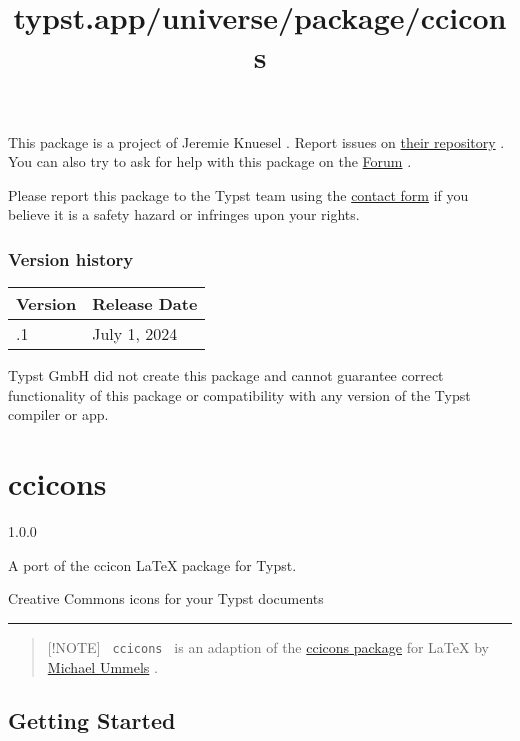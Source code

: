 This package is a project of Jeremie Knuesel . Report issues on
\href{https://github.com/knuesel/typst-minideck}{their repository} . You
can also try to ask for help with this package on the
\href{https://forum.typst.app}{Forum} .

Please report this package to the Typst team using the
\href{https://typst.app/contact}{contact form} if you believe it is a
safety hazard or infringes upon your rights.

\label{versions}
\subsubsection{Version history}\label{version-history}

\begin{longtable}[]{@{}ll@{}}
\toprule\noalign{}
Version & Release Date \\
\midrule\noalign{}
\endhead
\bottomrule\noalign{}
\endlastfoot
0.2.1 & July 1, 2024 \\
\end{longtable}

Typst GmbH did not create this package and cannot guarantee correct
functionality of this package or compatibility with any version of the
Typst compiler or app.


\title{typst.app/universe/package/ccicons}

\label{banner}
\section{ccicons}\label{ccicons}

{ 1.0.0 }

A port of the ccicon LaTeX package for Typst.

\label{readme}
Creative Commons icons for your Typst documents

\begin{center}\rule{0.5\linewidth}{0.5pt}\end{center}

\begin{quote}
{[}!NOTE{]} \texttt{\ ccicons\ } is an adaption of the
\href{https://ctan.org/pkg/ccicons}{ccicons package} for LaTeX by
\href{https://github.com/ummels}{Michael Ummels} .
\end{quote}

\subsection{Getting Started}\label{getting-started}

